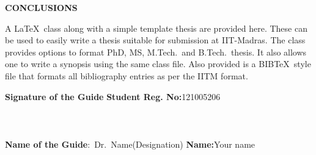 	
	\begin{center}
		\Large{{\textbf{CONCLUSIONS}}}
	\end{center}
	
		\noindent A \LaTeX\ class along with a simple template thesis are provided here.  These can be used to easily write a thesis suitable for submission at IIT-Madras.  The class provides options to format PhD, MS, M.Tech.\ and B.Tech.\ thesis.  It also allows one to write a synopsis using the same class file.  Also provided is a BIB\TeX\ style file that formats all bibliography entries as per the IITM format.
	
	\vspace*{24pt}
	
		\noindent \textbf{Signature of the Guide} \hspace*{70mm} \textbf{Student Reg. No:}121005206\\
			\\
		\\
		\\
	\noindent \textbf{Name of the Guide}:~Dr.~Name(Designation) \hspace*{35mm} \textbf{Name:}Your name
	\pagebreak
	\pagebreak
	
	
